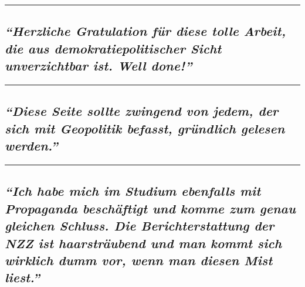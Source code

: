 \begin{center}\rule{0.5\linewidth}{\linethickness}\end{center}

\hypertarget{herzliche-gratulation-fuxfcr-diese-tolle-arbeit-die-aus-demokratiepolitischer-sicht-unverzichtbar-ist-well-done}{%
\subsection{\texorpdfstring{\emph{``Herzliche Gratulation für diese
tolle Arbeit, die aus demokratiepolitischer Sicht unverzichtbar ist.
Well
done!''}}{``Herzliche Gratulation für diese tolle Arbeit, die aus demokratiepolitischer Sicht unverzichtbar ist. Well done!''}}\label{herzliche-gratulation-fuxfcr-diese-tolle-arbeit-die-aus-demokratiepolitischer-sicht-unverzichtbar-ist-well-done}}

\begin{center}\rule{0.5\linewidth}{\linethickness}\end{center}

\hypertarget{diese-seite-sollte-zwingend-von-jedem-der-sich-mit-geopolitik-befasst-gruxfcndlich-gelesen-werden}{%
\subsection{\texorpdfstring{\emph{``Diese Seite sollte zwingend von
jedem, der sich mit Geopolitik befasst, gründlich gelesen
werden.''}}{``Diese Seite sollte zwingend von jedem, der sich mit Geopolitik befasst, gründlich gelesen werden.''}}\label{diese-seite-sollte-zwingend-von-jedem-der-sich-mit-geopolitik-befasst-gruxfcndlich-gelesen-werden}}

\begin{center}\rule{0.5\linewidth}{\linethickness}\end{center}

\hypertarget{ich-habe-mich-im-studium-ebenfalls-mit-propaganda-beschuxe4ftigt-und-komme-zum-genau-gleichen-schluss-die-berichterstattung-der-nzz-ist-haarstruxe4ubend-und-man-kommt-sich-wirklich-dumm-vor-wenn-man-diesen-mist-liest}{%
\subsection{\texorpdfstring{\emph{``Ich habe mich im Studium ebenfalls
mit Propaganda be­schäftigt und komme zum genau gleichen Schluss. Die
Be­richt­­­er­stattung der NZZ ist haar­­sträubend und man kommt sich
wirklich dumm vor, wenn man diesen Mist
liest.''}}{``Ich habe mich im Studium ebenfalls mit Propaganda be­schäftigt und komme zum genau gleichen Schluss. Die Be­richt­­­er­stattung der NZZ ist haar­­sträubend und man kommt sich wirklich dumm vor, wenn man diesen Mist liest.''}}\label{ich-habe-mich-im-studium-ebenfalls-mit-propaganda-beschuxe4ftigt-und-komme-zum-genau-gleichen-schluss-die-berichterstattung-der-nzz-ist-haarstruxe4ubend-und-man-kommt-sich-wirklich-dumm-vor-wenn-man-diesen-mist-liest}}

